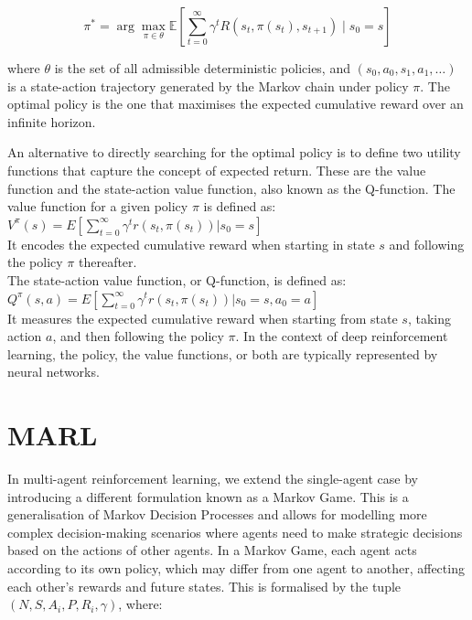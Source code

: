 \documentclass[a4paper,singleside,12pt]{report} %
\begin{document}
\begin{equation}
\pi^* = \arg \max_{\pi \in \theta} \mathbb{E}[\sum_{t=0}^{\infty} \gamma^t R(s_t, \pi(s_t), s_{t+1}) \mid s_0 = s]
\end{equation}

where \(\theta\) is the set of all admissible deterministic policies, and \((s_0, a_0, s_1, a_1, \dots)\) is a state-action trajectory generated by the Markov chain under policy \(\pi\). The optimal policy is the one that maximises the expected cumulative reward over an infinite horizon.

An alternative to directly searching for the optimal policy is to define two utility functions that capture the concept of expected return. These are the value function and the state-action value function, also known as the Q-function. The value function for a given policy \(\pi\) is defined as:\\
${V^{\pi}(s) = E [\sum_{t=0}^{\infty} \gamma^tr(s_t, \pi(s_t))|s_0 = s]}$ \\
It encodes the expected cumulative reward when starting in state \(s\) and following the policy \(\pi\) thereafter.\\
The state-action value function, or Q-function, is defined as: 
${Q^{\pi}(s, a) = E [\sum_{t=0}^{\infty} \gamma^tr(s_t, \pi(s_t))|s_0 = s, a_0 = a]}$ \\
It measures the expected cumulative reward when starting from state \(s\), taking action \(a\), and then following the policy \(\pi\). In the context of deep reinforcement learning, the policy, the value functions, or both are typically represented by neural networks.

\section{MARL}\label{marl}

In multi-agent reinforcement learning, we extend the single-agent case by introducing a different formulation known as a Markov Game. This is a generalisation of Markov Decision Processes and allows for modelling more complex decision-making scenarios where agents need to make strategic decisions based on the actions of other agents. In a Markov Game, each agent acts according to its own policy, which may differ from one agent to another, affecting each other's rewards and future states. This is formalised by the tuple \((N, S, {A_i}, P, {R_i}, \gamma)\), where:
\end{document}
